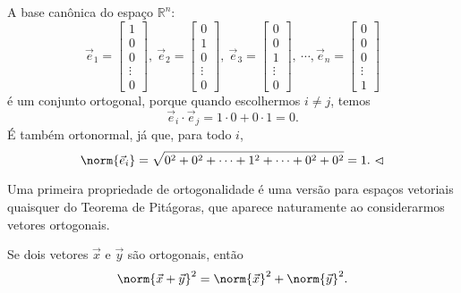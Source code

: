 \begin{ex}
	A base canônica do espaço $\mathbb{R}^n$:
	\begin{equation}
	\vec{e}_1 =
	\begin{bmatrix}
	1 \\ 0 \\ 0 \\ \vdots \\ 0
	\end{bmatrix}, \
	\vec{e}_2 =
	\begin{bmatrix}
	0 \\ 1 \\ 0 \\ \vdots \\ 0
	\end{bmatrix}, \
	\vec{e}_3 =
	\begin{bmatrix}
	0 \\ 0 \\ 1 \\ \vdots \\ 0
	\end{bmatrix}, \ \cdots,
	\vec{e}_n =
	\begin{bmatrix}
	0 \\ 0 \\ 0 \\ \vdots \\ 1
	\end{bmatrix}
	\end{equation} é um conjunto ortogonal, porque quando escolhermos $i\neq j$, temos
	\begin{equation}
	\vec{e}_i \cdot \vec{e}_j = 1 \cdot 0 + 0 \cdot 1 = 0.
	\end{equation} É também ortonormal, já que, para todo $i$,
	\begin{equation}
	\norm{\vec{e}_i}  = \sqrt{0^2 + 0^2 + \cdots + 1^2 + \cdots + 0^2 + 0^2} = 1. \ \lhd
	\end{equation}
\end{ex}

Uma primeira propriedade de ortogonalidade é uma versão para espaços vetoriais quaisquer do Teorema de Pitágoras, que aparece naturamente ao considerarmos vetores ortogonais.

\begin{teo}
	Se dois vetores $\vec{x}$ e $\vec{y}$ são ortogonais, então
	\begin{equation}
	\norm{\vec{x} + \vec{y}}^2 = \norm{\vec{x}}^2 + \norm{\vec{y}}^2.
	\end{equation}
\end{teo}

